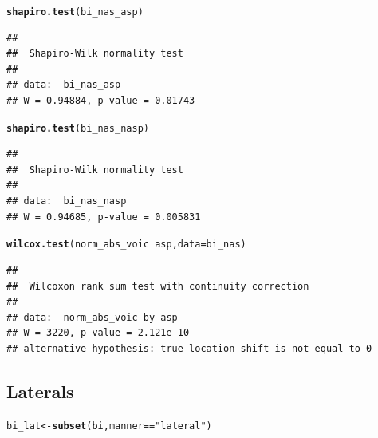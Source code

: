 \documentclass[a4paper,11pt]{article}\usepackage[]{graphicx}\usepackage[]{color}
\makeatletter
\newcommand{\hlstr}[1]{\textcolor[rgb]{0.192,0.494,0.8}{#1}}%
\newcommand{\hlopt}[1]{\textcolor[rgb]{0,0,0}{#1}}%
\newcommand{\hlstd}[1]{\textcolor[rgb]{0.345,0.345,0.345}{#1}}%
\newcommand{\hlkwb}[1]{\textcolor[rgb]{0.69,0.353,0.396}{#1}}%
\newcommand{\hlkwc}[1]{\textcolor[rgb]{0.333,0.667,0.333}{#1}}%
\newcommand{\hlkwd}[1]{\textcolor[rgb]{0.737,0.353,0.396}{\textbf{#1}}}%
\newenvironment{kframe}{%
 \def\at@end@of@kframe{}%
 \ifinner\ifhmode%
  \def\at@end@of@kframe{\end{minipage}}%
  \begin{minipage}{\columnwidth}%
 \fi\fi%
 \def\FrameCommand##1{\hskip\@totalleftmargin \hskip-\fboxsep
 \colorbox{shadecolor}{##1}\hskip-\fboxsep
     \hskip-\linewidth \hskip-\@totalleftmargin \hskip\columnwidth}%
 \MakeFramed {\advance\hsize-\width
   \@totalleftmargin\z@ \linewidth\hsize
   \@setminipage}}%
 {\par\unskip\endMakeFramed%
 \at@end@of@kframe}
\newenvironment{knitrout}{}{} %
\makeatother
\begin{document}
\begin{knitrout}
\color{fgcolor}\begin{kframe}
\begin{alltt}
\hlkwd{shapiro.test}\hlstd{(bi_nas_asp)}
\end{alltt}
\begin{verbatim}
## 
## 	Shapiro-Wilk normality test
## 
## data:  bi_nas_asp
## W = 0.94884, p-value = 0.01743
\end{verbatim}
\begin{alltt}
\hlkwd{shapiro.test}\hlstd{(bi_nas_nasp)}
\end{alltt}
\begin{verbatim}
## 
## 	Shapiro-Wilk normality test
## 
## data:  bi_nas_nasp
## W = 0.94685, p-value = 0.005831
\end{verbatim}
\begin{alltt}
\hlkwd{wilcox.test}\hlstd{(norm_abs_voic} \hlopt{~} \hlstd{asp,} \hlkwc{data} \hlstd{= bi_nas)}
\end{alltt}
\begin{verbatim}
## 
## 	Wilcoxon rank sum test with continuity correction
## 
## data:  norm_abs_voic by asp
## W = 3220, p-value = 2.121e-10
## alternative hypothesis: true location shift is not equal to 0
\end{verbatim}
\end{kframe}
\end{knitrout}

\subsection{Laterals}

\begin{knitrout}
\color{fgcolor}\begin{kframe}
\begin{alltt}
\hlstd{bi_lat} \hlkwb{<-} \hlkwd{subset}\hlstd{(bi, manner} \hlopt{==} \hlstr{"lateral"}\hlstd{)}
\end{alltt}
\end{kframe}
\end{knitrout}
\end{document}
